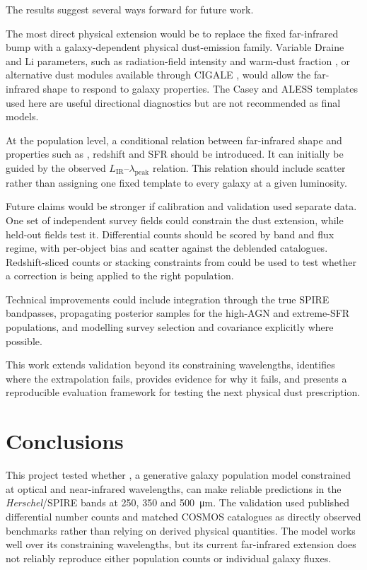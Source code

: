\documentclass[12pt,a4paper]{article}
\begin{document}
The results suggest several ways forward for future \popcosmos{} work.

The most direct physical extension would be to replace the fixed far-infrared bump with a
galaxy-dependent physical dust-emission family. Variable Draine and Li parameters, such
as radiation-field intensity and warm-dust fraction \citep{Draine_2007}, or alternative
dust modules available through CIGALE \citep{Boquien_2019}, would allow the far-infrared shape to respond to
galaxy properties. The Casey and ALESS templates used here are useful directional diagnostics but are not
recommended as final models.

At the population level, a conditional relation between far-infrared shape and
properties such as \LIR{}, redshift and SFR should be introduced. It can initially be guided by
the observed $L_\mathrm{IR}$--$\lambda_\mathrm{peak}$ relation. This relation should
include scatter rather than assigning one fixed template to every galaxy at a
given luminosity.

Future claims would be stronger if calibration and validation used separate data. One
set of independent survey fields could constrain the dust extension, while held-out
fields test it. Differential counts should be scored by band and flux regime, with per-object bias
and scatter against the deblended catalogues. Redshift-sliced counts or stacking
constraints from \citet{B_thermin_2012} could be used to test whether a correction is being applied
to the right population.

Technical improvements could include integration through the true SPIRE bandpasses,
propagating posterior samples for the high-AGN and extreme-SFR populations, and
modelling survey selection and covariance explicitly where possible.

This work extends \popcosmos{} validation beyond its constraining wavelengths, identifies
where the extrapolation fails, provides evidence for why it fails, and presents a reproducible
evaluation framework for testing the next physical dust prescription.

\section{Conclusions}
\label{sec:conclusions}

This project tested whether \popcosmos{}, a generative galaxy population model
constrained at optical and near-infrared wavelengths, can make reliable predictions in the
\emph{Herschel}/SPIRE bands at 250, 350 and \SI{500}{\um}. The validation used
published differential number counts and matched COSMOS catalogues as directly observed
benchmarks rather than relying on derived physical quantities. The model works well over
its constraining wavelengths, but its current far-infrared extension does not reliably
reproduce either population counts or individual galaxy fluxes.
\end{document}
